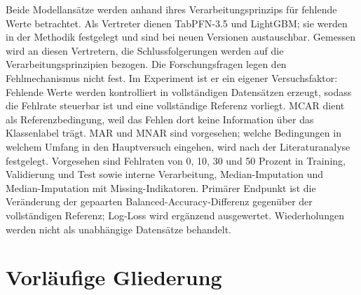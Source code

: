 \documentclass[11pt,a4paper]{article}
\begin{document}
Beide Modellansätze werden anhand ihres Verarbeitungsprinzips für
fehlende Werte betrachtet. Als
Vertreter dienen TabPFN-3.5 und LightGBM; sie werden in der Methodik
festgelegt und sind bei neuen Versionen austauschbar. Gemessen wird an
diesen Vertretern, die Schlussfolgerungen werden auf die
Verarbeitungsprinzipien bezogen.
Die Forschungsfragen legen den Fehlmechanismus nicht fest. Im
Experiment ist er ein eigener Versuchsfaktor: Fehlende Werte werden
kontrolliert in vollständigen Datensätzen erzeugt, sodass die Fehlrate
steuerbar ist und eine vollständige Referenz vorliegt. MCAR dient als
Referenzbedingung, weil das Fehlen dort keine Information über das
Klassenlabel trägt. MAR und MNAR sind vorgesehen; welche Bedingungen
in welchem Umfang in den Hauptversuch eingehen, wird nach der
Literaturanalyse festgelegt. Vorgesehen sind Fehlraten von 0, 10, 30 und
50 Prozent in Training, Validierung und Test sowie interne Verarbeitung,
Median-Imputation und Median-Imputation mit Missing-Indikatoren.
Primärer Endpunkt ist die Veränderung der gepaarten
Balanced-Accuracy-Differenz gegenüber der vollständigen Referenz;
Log-Loss wird ergänzend ausgewertet. Wiederholungen werden nicht als
unabhängige Datensätze behandelt.

\section*{Vorläufige Gliederung}
\end{document}

